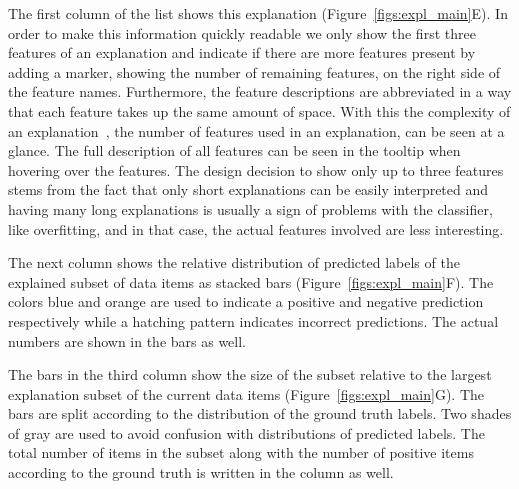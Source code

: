 The first column of the list shows this explanation (Figure~\ref{figs:expl_main}E).
In order to make this information quickly readable we only show the first three features of an explanation and indicate if there are more features present by adding a marker, showing the number of remaining features, on the right side of the feature names.
Furthermore, the feature descriptions are abbreviated in a way that each feature takes up the same amount of space.
With this the complexity of an explanation~\ie, the number of features used in an explanation, can be seen at a glance.
The full description of all features can be seen in the tooltip when hovering over the features.
The design decision to show only up to three features stems from the fact that only short explanations can be easily interpreted and having many long explanations is usually a sign of problems with the classifier, like overfitting, and in that case, the actual features involved are less interesting.

The next column shows the relative distribution of predicted labels of the explained subset of data items as stacked bars (Figure~\ref{figs:expl_main}F).
The colors blue and orange are used to indicate a positive and negative prediction respectively while a hatching pattern indicates incorrect predictions.
The actual numbers are shown in the bars as well.



The bars in the third column show the size of the subset relative to the largest explanation subset of the current data items (Figure~\ref{figs:expl_main}G).
The bars are split according to the distribution of the ground truth labels.
Two shades of gray are used to avoid confusion with distributions of predicted labels.
The total number of items in the subset along with the number of positive items according to the ground truth is written in the column as well.



